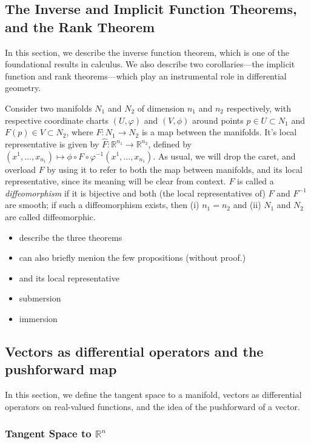 \documentclass[psamsfonts]{amsart}
\theoremstyle{definition}
\theoremstyle{remark}
\newcommand*\R{\mathds{R}}
\numberwithin{equation}{section}
\begin{document}
\subsection{The Inverse and Implicit Function Theorems, and the Rank Theorem}
In this section, we describe the inverse function theorem, which is one of the foundational results in calculus. We also describe two corollaries---the implicit function and rank theorems---which play an instrumental role in differential geometry. 

Consider two manifolds $N_1$ and $N_2$ of dimension $n_1$ and $n_2$ respectively, with respective coordinate charts $(U, \varphi)$ and $(V, \phi)$ around points $p\in U\subset N_1$ and $F(p)\in V \subset N_2$, where $F:N_1 \rightarrow N_2$ is a map between the manifolds. It's local representative is given by $\hat F: \R^{n_1}\rightarrow \R^{n_2}$, defined by $(x^1, \dots, x_{n_1}) \mapsto \phi \circ F\circ \varphi^{-1}(x^1, \dots, x_{n_1})$. As usual, we will drop the caret, and overload $F$ by using it to refer to both the map between manifolds, and its local representative, since its meaning will be clear from context. $F$ is called a \textit{diffeomorphism} if it is bijective and both (the local representatives of) $F$ and $F^{-1}$ are smooth; if such a diffeomorphism exists, then (i) $n_1=n_2$ and (ii) $N_1$ and $N_2$ are called diffeomorphic. %

\begin{itemize}
\item describe the three theorems
\item can also briefly menion the few propositions (without proof.)
\item and its local representative 
\item submersion
\item immersion
\end{itemize}

\subsection{Vectors as differential operators and the pushforward map}
In this section, we define the tangent space to a manifold, vectors as differential operators on real-valued functions, and the idea of the pushforward of a vector. 

\subsubsection{Tangent Space to $\R^n$}
\end{document}
